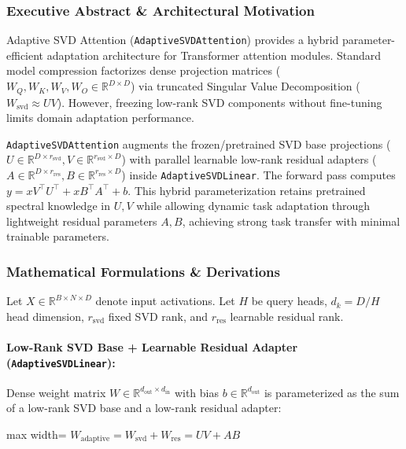 \subsubsection*{Executive Abstract \& Architectural Motivation}

Adaptive SVD Attention (\texttt{AdaptiveSVDAttention}) provides a hybrid parameter-efficient adaptation architecture for Transformer attention modules. Standard model compression factorizes dense projection matrices ($W_Q, W_K, W_V, W_O \in \mathbb{R}^{D \times D}$) via truncated Singular Value Decomposition ($W_{\text{svd}} \approx U V$). However, freezing low-rank SVD components without fine-tuning limits domain adaptation performance.

\texttt{AdaptiveSVDAttention} augments the frozen/pretrained SVD base projections ($U \in \mathbb{R}^{D \times r_{\text{svd}}}, V \in \mathbb{R}^{r_{\text{svd}} \times D}$) with parallel learnable low-rank residual adapters ($A \in \mathbb{R}^{D \times r_{\text{res}}}, B \in \mathbb{R}^{r_{\text{res}} \times D}$) inside \texttt{AdaptiveSVDLinear}. The forward pass computes $y = x V^\top U^\top + x B^\top A^\top + b$. This hybrid parameterization retains pretrained spectral knowledge in $U, V$ while allowing dynamic task adaptation through lightweight residual parameters $A, B$, achieving strong task transfer with minimal trainable parameters.


\subsubsection*{Mathematical Formulations \& Derivations}

Let $X \in \mathbb{R}^{B \times N \times D}$ denote input activations. Let $H$ be query heads, $d_k = D / H$ head dimension, $r_{\text{svd}}$ fixed SVD rank, and $r_{\text{res}}$ learnable residual rank.

\paragraph{Low-Rank SVD Base + Learnable Residual Adapter (\texttt{AdaptiveSVDLinear}):}
Dense weight matrix $W \in \mathbb{R}^{d_{\text{out}} \times d_{\text{in}}}$ with bias $b \in \mathbb{R}^{d_{\text{out}}}$ is parameterized as the sum of a low-rank SVD base and a low-rank residual adapter:

\begin{center}
\begin{adjustbox}{max width=\columnwidth}
$\displaystyle
W_{\text{adaptive}} = W_{\text{svd}} + W_{\text{res}} = U V + A B
$
\end{adjustbox}
\end{center}

